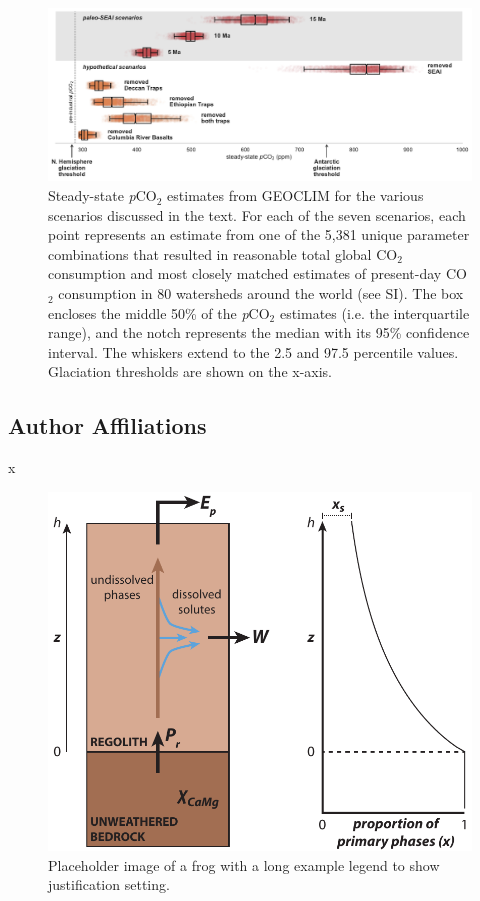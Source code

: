 \documentclass[9pt,twocolumn,twoside,lineno]{pnas-new}
\newcommand{\pCOtwo}{\textit{p}CO$_{2}$\xspace}
\newcommand{\COtwo}{CO$_{2}$\xspace}
\begin{document}
\begin{figure}
    \centering
    \includegraphics[width=1\linewidth]{Figures/scenario_pCO2.pdf}
    \caption{Steady-state \pCOtwo estimates from GEOCLIM for the various scenarios discussed in the text. For each of the seven scenarios, each point represents an estimate from one of the 5,381 unique parameter combinations that resulted in reasonable total global \COtwo consumption and most closely matched estimates of present-day \COtwo consumption in 80 watersheds around the world (see SI). The box encloses the middle 50\% of the \pCOtwo estimates (i.e. the interquartile range), and the notch represents the median with its 95\% confidence interval. The whiskers extend to the 2.5 and 97.5 percentile values. Glaciation thresholds \cite{DeConto2008a} are shown on the x-axis.}
    \label{fig:scenario_pCO2}
\end{figure}

\subsection*{Author Affiliations}

x

\begin{figure}%
\centering
\includegraphics[width=.8\linewidth]{Figures/regolith_schematic.pdf}
\caption{Placeholder image of a frog with a long example legend to show justification setting.}
\label{fig:frog}
\end{figure}
\end{document}
